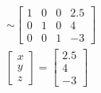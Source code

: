 \documentclass[11pt, a4paper, norsk]{NTNUoving}
\begin{document}
\begin{oppgave}
\begin{punkt}
\begin{align*}
           \\&\sim
        \begin{bmatrix} %
            1 & 0 & 0 & 2.5\\
            0 & 1 & 0 & 4\\
            0 & 0 & 1 & -3
        \end{bmatrix}
        \end{align*}
        \begin{align*}
        \begin{bmatrix} %
            x\\
            y\\
            z
        \end{bmatrix}
        =
        \begin{bmatrix} %
        2.5\\
            4\\
            -3
        \end{bmatrix}
        \end{align*}
    \end{punkt}
    

\end{oppgave}
\end{document}
